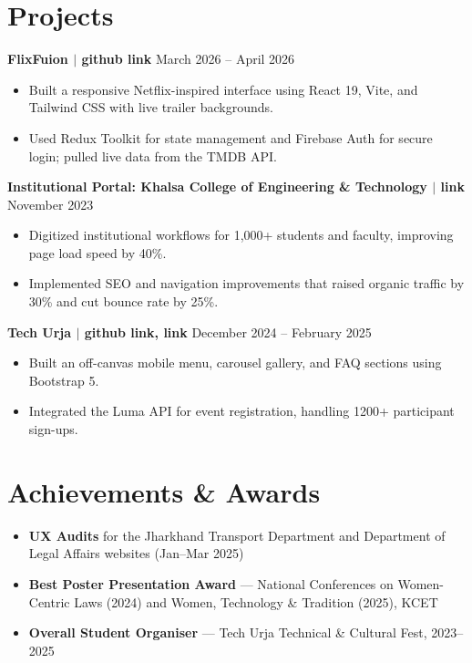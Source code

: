 \documentclass[10.5pt,a4paper]{article}
\newcommand{\jobheader}[3]{%
  \noindent\textbf{#1} \hfill #2 \\
  \textit{#3}
}
\begin{document}
\section*{Projects}

\jobheader{FlixFuion \textnormal{$|$ github link}}{March 2026 -- April 2026}{}
\begin{itemize}
    \item Built a responsive Netflix-inspired interface using React 19, Vite, and Tailwind CSS with live trailer backgrounds.
    \item Used Redux Toolkit for state management and Firebase Auth for secure login; pulled live data from the TMDB API.
\end{itemize}

\jobheader{Institutional Portal: Khalsa College of Engineering \& Technology \textnormal{$|$ link}}{November 2023}{}
\begin{itemize}
    \item Digitized institutional workflows for 1,000+ students and faculty, improving page load speed by 40\%.
    \item Implemented SEO and navigation improvements that raised organic traffic by 30\% and cut bounce rate by 25\%.
\end{itemize}

\jobheader{Tech Urja \textnormal{$|$ github link, link}}{December 2024 -- February 2025}{}
\begin{itemize}
    \item Built an off-canvas mobile menu, carousel gallery, and FAQ sections using Bootstrap 5.
    \item Integrated the Luma API for event registration, handling 1200+ participant sign-ups.
\end{itemize}

\section*{Achievements \& Awards}
\begin{itemize}
    \item \textbf{UX Audits} for the Jharkhand Transport Department and Department of Legal Affairs websites (Jan--Mar 2025)
    \item \textbf{Best Poster Presentation Award} --- National Conferences on Women-Centric Laws (2024) and Women, Technology \& Tradition (2025), KCET
    \item \textbf{Overall Student Organiser} --- Tech Urja Technical \& Cultural Fest, 2023--2025
\end{itemize}
\end{document}
